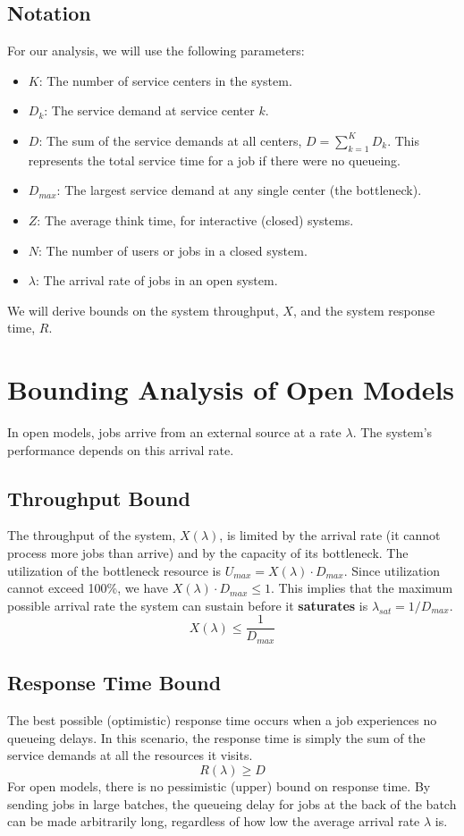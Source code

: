 \subsection{Notation}
For our analysis, we will use the following parameters:
\begin{itemize}
    \item $K$: The number of service centers in the system.
    \item $D_k$: The service demand at service center $k$.
    \item $D$: The sum of the service demands at all centers, $D = \sum_{k=1}^{K} D_k$. This represents the total service time for a job if there were no queueing.
    \item $D_{max}$: The largest service demand at any single center (the bottleneck).
    \item $Z$: The average think time, for interactive (closed) systems.
    \item $N$: The number of users or jobs in a closed system.
    \item $\lambda$: The arrival rate of jobs in an open system.
\end{itemize}
We will derive bounds on the system throughput, $X$, and the system response time, $R$.

\section{Bounding Analysis of Open Models}
In open models, jobs arrive from an external source at a rate $\lambda$. The system's performance depends on this arrival rate.

\subsection{Throughput Bound}
The throughput of the system, $X(\lambda)$, is limited by the arrival rate (it cannot process more jobs than arrive) and by the capacity of its bottleneck. The utilization of the bottleneck resource is $U_{max} = X(\lambda) \cdot D_{max}$. Since utilization cannot exceed 100\%, we have $X(\lambda) \cdot D_{max} \le 1$. This implies that the maximum possible arrival rate the system can sustain before it \textbf{saturates} is $\lambda_{sat} = 1 / D_{max}$.
\begin{equation}
    X(\lambda) \le \frac{1}{D_{max}}
\end{equation}

\subsection{Response Time Bound}
The best possible (optimistic) response time occurs when a job experiences no queueing delays. In this scenario, the response time is simply the sum of the service demands at all the resources it visits.
\begin{equation}
    R(\lambda) \ge D
\end{equation}
For open models, there is no pessimistic (upper) bound on response time. By sending jobs in large batches, the queueing delay for jobs at the back of the batch can be made arbitrarily long, regardless of how low the average arrival rate $\lambda$ is.

